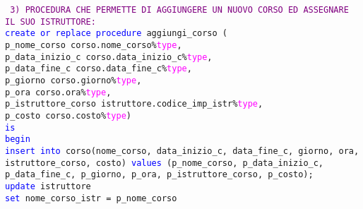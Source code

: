 \documentclass{article}
\begin{document}
    \newpage
    \begin{flushleft}
        \texttt{
        \textcolor{purple}{3) PROCEDURA CHE PERMETTE DI AGGIUNGERE UN NUOVO CORSO ED ASSEGNARE IL SUO \hspace*{2em}ISTRUTTORE:} \\
        \hspace*{2em}\textcolor{blue}{create or replace procedure} aggiungi\_corso ( \\
        \hspace*{4em}p\_nome\_corso corso.nome\_corso\%\textcolor{magenta}{type}, \\
        \hspace*{4em}p\_data\_inizio\_c corso.data\_inizio\_c\%\textcolor{magenta}{type}, \\
        \hspace*{4em}p\_data\_fine\_c corso.data\_fine\_c\%\textcolor{magenta}{type}, \\
        \hspace*{4em}p\_giorno corso.giorno\%\textcolor{magenta}{type}, \\
        \hspace*{4em}p\_ora corso.ora\%\textcolor{magenta}{type}, \\
        \hspace*{4em}p\_istruttore\_corso istruttore.codice\_imp\_istr\%\textcolor{magenta}{type}, \\
        \hspace*{4em}p\_costo corso.costo\%\textcolor{magenta}{type}) \\
        \hspace*{2em}\textcolor{blue}{is} \\
        \hspace*{2em}\textcolor{blue}{begin} \\
        \hspace*{4em}\textcolor{blue}{insert into} corso(nome\_corso, data\_inizio\_c, data\_fine\_c, giorno, ora, \hspace*{4em}istruttore\_corso, costo) \textcolor{blue}{values} (p\_nome\_corso, p\_data\_inizio\_c, \hspace*{4em}p\_data\_fine\_c, p\_giorno, p\_ora, p\_istruttore\_corso, p\_costo); \\
        \hspace*{4em}\textcolor{blue}{update} istruttore \\
        \hspace*{4em}\textcolor{blue}{set} nome\_corso\_istr = p\_nome\_corso \\
}
\end{flushleft}
\end{document}
